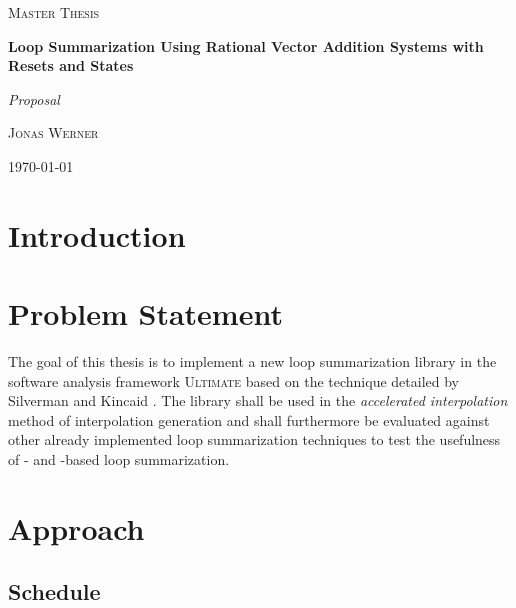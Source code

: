 \documentclass{article}
\begin{document}
\newcommand{\HorizontalLine}{\rule{\linewidth}{0.3mm}}

\begin{center}
	{\scshape\Large Master Thesis \par}
	\vspace{1.5cm}
	{\huge\bfseries Loop Summarization Using Rational Vector Addition Systems with Resets and States \par}
    {\huge \itshape Proposal \par}
	\vspace{1cm}
	{\large \scshape Jonas Werner\par}
	\vspace{0.5cm}
	{\today \vspace{2cm}}
\end{center}

\vspace*{1cm}

\section{Introduction}


\section{Problem Statement}
The goal of this thesis is to implement a new loop summarization library in the software analysis framework \textsc{Ultimate}\cite{Zitat02} based on the technique detailed by Silverman and Kincaid \cite{10.1007/978-3-030-25543-5_7}. The library shall be used in the \textsl{accelerated interpolation} method of interpolation generation and shall furthermore be evaluated against other already implemented loop summarization techniques to test the usefulness of \qvasr- and \qvasrs-based loop summarization.
\section{Approach}


\begin{landscape}
\section{Schedule}


\end{landscape}



\pagebreak
{}


\end{document}
